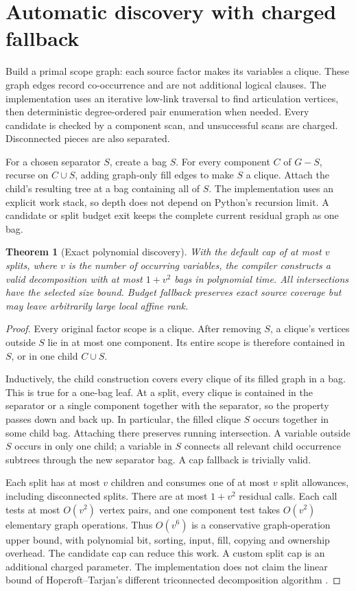 \documentclass[11pt]{article}
\newtheorem{theorem}{Theorem}
\begin{document}
\section{Automatic discovery with charged fallback}
Build a primal scope graph: each source factor makes its variables a clique.
These graph edges record co-occurrence and are not additional logical clauses.
The implementation uses an iterative low-link traversal to find articulation
vertices, then deterministic degree-ordered pair enumeration when needed.
Every candidate is checked by a component scan, and unsuccessful scans are
charged. Disconnected pieces are also separated.

For a chosen separator \(S\), create a bag \(S\). For every component
\(C\) of \(G-S\), recurse on \(C\cup S\), adding graph-only fill edges
to make \(S\) a clique. Attach the child's resulting tree at a bag containing
all of \(S\). The implementation uses an explicit work stack, so depth does
not depend on Python's recursion limit. A candidate or split budget exit
keeps the complete current residual graph as one bag.

\begin{theorem}[Exact polynomial discovery]
With the default cap of at most \(v\) splits, where \(v\) is the number
of occurring variables, the compiler constructs a valid decomposition with
at most \(1+v^2\) bags in polynomial time. All intersections have the selected
size bound. Budget fallback preserves exact source coverage but may leave
arbitrarily large local affine rank.
\end{theorem}
\begin{proof}
Every original factor scope is a clique. After removing \(S\), a clique's
vertices outside \(S\) lie in at most one component. Its entire scope is
therefore contained in \(S\), or in one child \(C\cup S\).

Inductively, the child construction covers every clique of its filled graph
in a bag. This is true for a one-bag leaf. At a split, every clique is
contained in the separator or a single component together with the separator,
so the property passes down and back up. In particular, the filled clique
\(S\) occurs together in some child bag. Attaching there preserves running
intersection. A variable outside \(S\) occurs in only one child; a variable
in \(S\) connects all relevant child occurrence subtrees through the new
separator bag. A cap fallback is trivially valid.

Each split has at most \(v\) children and consumes one of at most \(v\)
split allowances, including disconnected splits. There are at most
\(1+v^2\) residual calls. Each call tests at most \(O(v^2)\) vertex pairs,
and one component test takes \(O(v^2)\) elementary graph operations.
Thus \(O(v^6)\) is a conservative graph-operation upper bound, with polynomial
bit, sorting, input, fill, copying and ownership overhead. The candidate cap
can reduce this work. A custom split cap is an additional charged parameter.
The implementation does not claim the linear bound of Hopcroft--Tarjan's
different triconnected decomposition algorithm \cite{hopcroft1973}.
\end{proof}
\end{document}
